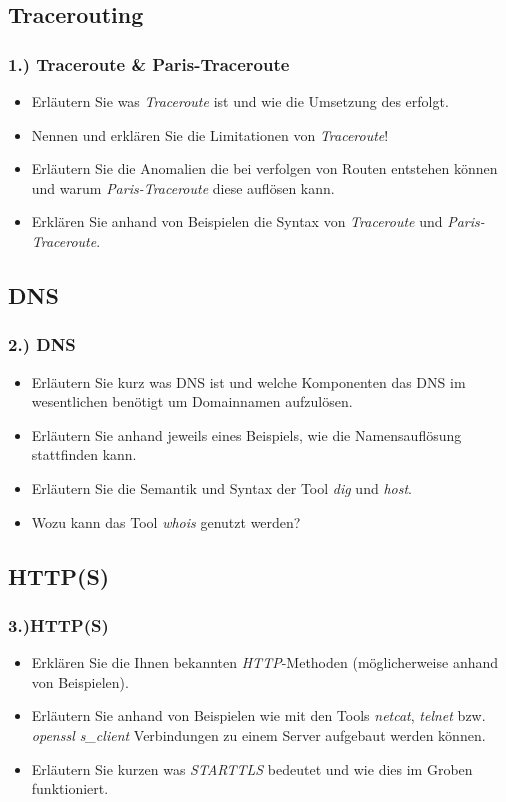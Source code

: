 \documentclass[xcolor=dvipsnames, aspectratio=169]{beamer}
\begin{document}
\subsection{Tracerouting}
\begin{frame}
\frametitle{1.) Traceroute \& Paris-Traceroute}
	\begin{itemize}
		\item Erläutern Sie was \emph{Traceroute} ist und wie die Umsetzung des erfolgt.
		\item Nennen und erklären Sie die Limitationen von \emph{Traceroute}!
		\item Erläutern Sie die Anomalien die bei verfolgen von Routen entstehen können und warum \emph{Paris-Traceroute} diese auflösen kann.
		\item Erklären Sie anhand von Beispielen die Syntax von \emph{Traceroute} und \emph{Paris-Traceroute}.
	\end{itemize}
\end{frame}

\subsection{DNS}
\begin{frame}
	\frametitle{2.) DNS}
	\begin{itemize}
		\item Erläutern Sie kurz was DNS ist und welche Komponenten das DNS im wesentlichen benötigt um Domainnamen aufzulösen.
		\item Erläutern Sie anhand jeweils eines Beispiels, wie die Namensauflösung stattfinden kann.
		\item Erläutern Sie die Semantik und Syntax der Tool \emph{dig} und \emph{host}. 
		\item Wozu kann das Tool \emph{whois} genutzt werden?
	\end{itemize}
\end{frame}


\subsection{HTTP(S)}
\begin{frame}
	\frametitle{3.)HTTP(S)}
	\begin{itemize}
		\item Erklären Sie die Ihnen bekannten \emph{HTTP}-Methoden (möglicherweise anhand von Beispielen).
		\item Erläutern Sie anhand von Beispielen wie mit den Tools \emph{netcat}, \emph{telnet} bzw. \emph{openssl s\_client} Verbindungen zu einem Server aufgebaut werden können.
		\item Erläutern Sie kurzen was \emph{STARTTLS} bedeutet und wie dies im Groben funktioniert.
	\end{itemize}
\end{frame}
\end{document}
